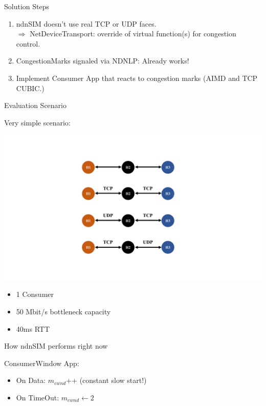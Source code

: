 \begin{frame}{Solution Steps}

\begin{enumerate}
\item ndnSIM doesn't use real TCP or UDP faces.\\
$\Rightarrow$ NetDeviceTransport: override of
virtual function(s) for congestion control.
\pause

\item CongestionMarks signaled via NDNLP: Already works! 
\pause

\item Implement Consumer App that reacts to congestion marks (AIMD and TCP CUBIC.)

\end{enumerate}

\end{frame}


\begin{frame}{Evaluation Scenario}

Very simple scenario: 

\includegraphics[width=\linewidth]{figs/Figure_3.pdf}

\begin{itemize}
\item 1 Consumer
\item 50 Mbit/s bottleneck capacity
\item 40ms RTT
\end{itemize}


\end{frame}


\begin{frame}{How ndnSIM performs right now}

ConsumerWindow App: 

\begin{itemize}
\item On Data: $m_{cwnd}$++ (constant slow start!)
\item On TimeOut: $m_{cwnd} \leftarrow 2$
\end{itemize}



\end{frame}

